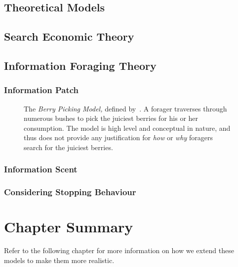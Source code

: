\subsection{Theoretical Models}

\subsection{Search Economic Theory}

\subsection{Information Foraging Theory}

\subsubsection{Information Patch}

\begin{figure}[t!]
    \centering
    \caption[The Berry Picking Model~\cite{bates1989berry_picking}]{The \emph{Berry Picking Model,} defined by~\cite{bates1989berry_picking}. A forager traverses through numerous bushes to pick the juiciest berries for his or her consumption. The model is high level and conceptual in nature, and thus does not provide any justification for \emph{how} or \emph{why} foragers search for the juiciest berries.}
    \label{fig:berry_picking}
\end{figure}

\subsubsection{Information Scent}

\subsubsection{Considering Stopping Behaviour}

\section{Chapter Summary}
Refer to the following chapter for more information on how we extend these models to make them more realistic.

